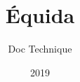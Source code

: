\documentclass[report]{BetterDocument}
\title{Équida}
\subtitle{Doc Technique}
\date{2019}
\begin{document}
	\pageDeGarde

	\tableDesMatieres

	

	

	

	

	

	
\end{document}
